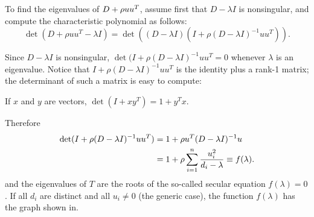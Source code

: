 \documentclass{article}
\begin{document}
To find the eigenvalues of $D + \rho uu^{T}$, assume first that
$D - \lambda I$ is nonsingular, and compute the characteristic polynomial
as follows:
\begin{equation}
  \label{eq:3}
  \det(D + \rho uu^T - \lambda I) 
  = \det((D - \lambda I)(I + \rho(D - \lambda I )^{-1}uu^T)).
\end{equation}

Since $D - \lambda I$ is nonsingular, $\det(I + \rho(D -
\lambda I)^{-1}uu^T = 0$ whenever $\lambda$ is an eigenvalue. Notice that
$I+\rho(D - \lambda I)^{-1}uu^T$ is the identity plus a rank-1 matrix; the
determinant of such a matrix is easy to compute:

\begin{lemma}
  If $x$ and $y$ are vectors, $\det(I + xy^T) = 1 + y^Tx$.
\end{lemma}
Therefore
\begin{equation}\notag
  \begin{aligned}
    \det(I + \rho(D - \lambda I)^{-1}uu^T)  & = 1 + \rho u^T(D - \lambda
                                              I)^{-1}u \\
      & = 1 + \rho\sum_{i=1}^n \frac{u_i^2}{d_i-\lambda} \equiv f(\lambda). 
  \end{aligned}
\end{equation}
and the eigenvalues of $T$ are the roots of the so-called secular equation
$f(\lambda) = 0$. If all $d_i$ are distinct and all $u_i\neq 0$ (the
generic case), the function $f(\lambda)$ has the graph shown in.



\newpage


\end{document}
